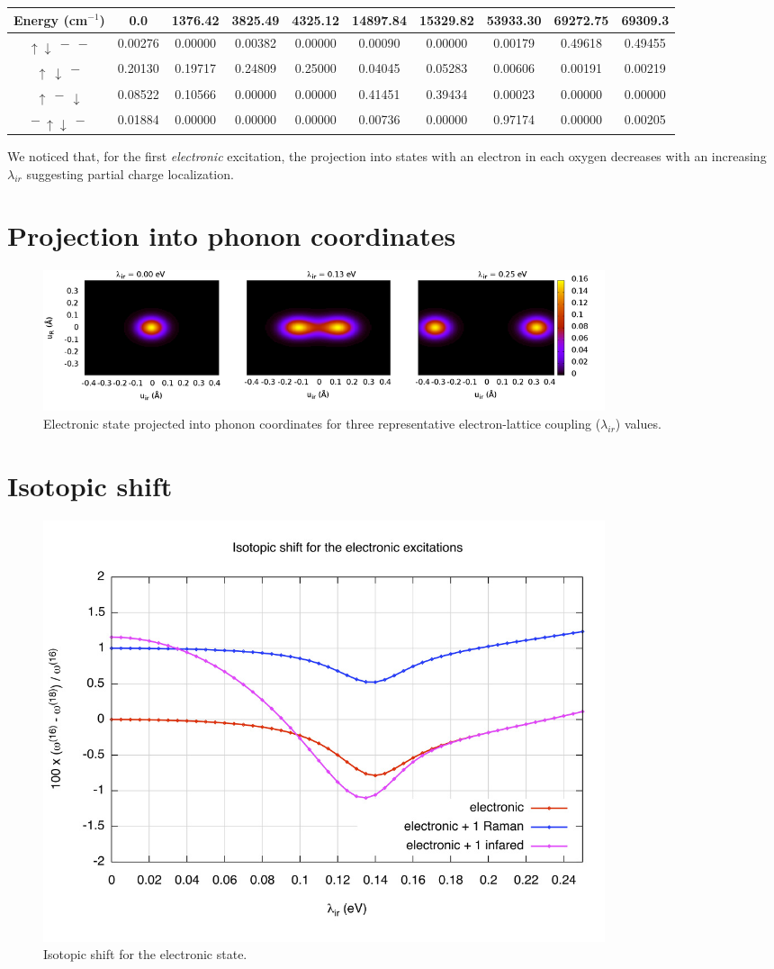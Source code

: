 \noindent\begin{tabular}{| c | c | c | c | c | c | c | c | c | c |}
\hline
Energy (cm$^{-1}$) & 0.0 & 1376.42 & 3825.49 & 4325.12 & 14897.84 & 15329.82 & 53933.30 & 69272.75 & 69309.3 \\
\hline
$\uparrow \downarrow \ - \ -$ & 0.00276 & 0.00000 & 0.00382 & 0.00000 & 0.00090 & 0.00000 & 0.00179 & 0.49618 & 0.49455 \\
$\uparrow\  \downarrow \ -$ & 0.20130 & 0.19717 & 0.24809 & 0.25000 & 0.04045 & 0.05283 & 0.00606 & 0.00191 & 0.00219 \\
$\uparrow \ - \ \downarrow$ & 0.08522 & 0.10566 & 0.00000 & 0.00000 & 0.41451 & 0.39434 & 0.00023 & 0.00000 & 0.00000 \\
$ - \ \uparrow \downarrow \ -$ & 0.01884 & 0.00000 & 0.00000 & 0.00000 & 0.00736 & 0.00000 & 0.97174 & 0.00000 & 0.00205 \\
\hline
\end{tabular}

We noticed\cite{GarciaSaraviaOrtizdeMontellano2013} that, for the first \textit{electronic} excitation, the projection into states with an electron in each oxygen decreases with an increasing $\lambda_{ir}$ suggesting partial charge localization.

\section{Projection into phonon coordinates}

\begin{figure}[ht!]
\centering
\includegraphics[width=0.8\textwidth]{images/ph-electronic.png}
\caption{Electronic state projected into phonon coordinates for three representative electron-lattice coupling ($\lambda_{ir}$) values.}
\label{fig:ph-electronic.png}
\end{figure}

\section{Isotopic shift}

\begin{figure}[ht!]
\centering
\includegraphics[width=0.8\textwidth]{images/isot-el.jpg}
\caption{Isotopic shift for the electronic state.}
\label{fig:isot-el}
\end{figure}

